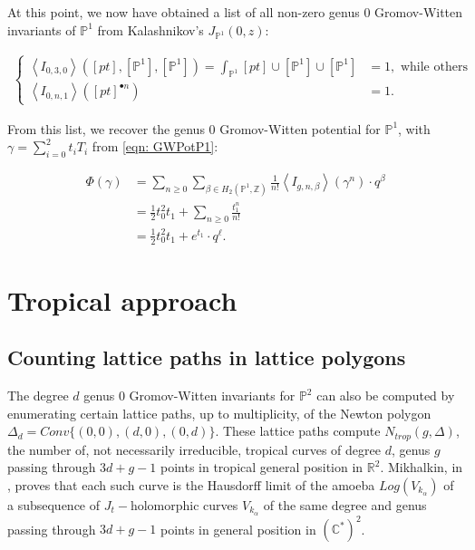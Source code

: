 \documentclass{amsart}
\newcommand{\PP}{\mathbb{P}}\newcommand{\A}{\mathbb{A}}\newcommand{\Z}{\mathbb{Z}}\newcommand{\C}{\mathbb{C}}\newcommand{\N}{\mathbb{N}}\newcommand{\T}{\mathbb{T}}
\begin{document}
At this point, we now have obtained a list of all non-zero genus 0 Gromov-Witten invariants of $\PP^1$ from Kalashnikov's $J_{\PP^1}(0,z)$:

\begin{align*}
    \begin{cases} \left< I_{0,3,0}\right>([pt],[\PP^1],[\PP^1]) = \int_{\PP^1} [pt]\cup[\PP^1]\cup[\PP^1] &= 1, \text{ while others reduce to}\\
     \left<I_{0,n,1}\right>([pt]^{\bullet n}) &= 1. \end{cases}
\end{align*}

From this list, we recover the genus $0$ Gromov-Witten potential for $\PP^1$, with $\gamma = \sum_{i=0}^2 t_i T_i$ from \eqref{eqn: GWPotP1}:

\begin{align*}
    \Phi(\gamma) &= \sum_{n\geq 0}\sum_{\beta \in H_2(\PP^1, \Z) } \frac{1}{n!} \left< I_{g,n,\beta} \right> (\gamma^n) \cdot q^\beta \\
    &= \frac{1}{2}t_0^2 t_1 + \sum_{n\geq 0} \frac{t_1^n}{n!} \\
    &= \frac{1}{2} t_0^2 t_1 + e^{t_1} \cdot q^\ell. 
\end{align*}





\section{Tropical approach}


\subsection{Counting lattice paths in lattice polygons} The degree $d$ genus $0$ Gromov-Witten invariants for $\mathbb{P}^2$ can also be computed by enumerating certain lattice paths, up to multiplicity, of the Newton polygon $\Delta_d=Conv\{(0,0), (d, 0), (0,d)\}$. These lattice paths compute $N_{trop}(g, \Delta)$, the number of, not necessarily irreducible, tropical curves of degree $d$, genus $g$ passing through $3d+g-1$ points in tropical general position in $\mathbb{R}^2$. Mikhalkin, in \cite{MikEnumTropGeom}, proves that each such curve is the Hausdorff limit of the amoeba $Log(V_{k_{\alpha}})$ of a subsequence of $J_t-$holomorphic curves $V_{k_{\alpha}}$ of the same degree and genus passing through $3d+g-1$ points in general position in $(\mathbb{C}^*)^2$. 
\end{document}

